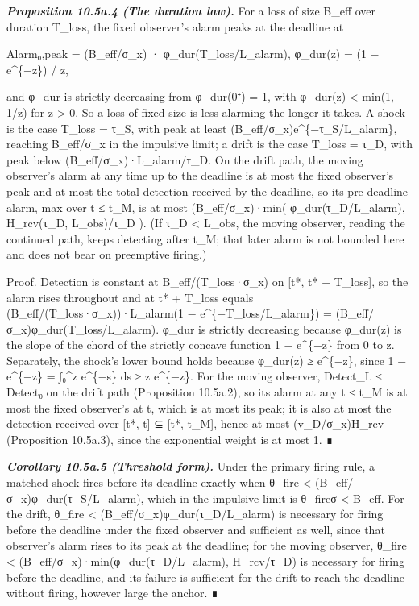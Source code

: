 \documentclass[
]{article}
\begin{document}
\emph{\textbf{Proposition 10.5a.4 (The duration law).}} For a loss of
size B\_eff over duration T\_loss, the fixed observer's alarm peaks at
the deadline at

Alarm₀,peak = (B\_eff/σ\_x) · φ\_dur(T\_loss/L\_alarm), φ\_dur(z) = (1 −
e\^{}\{−z\}) / z,

and φ\_dur is strictly decreasing from φ\_dur(0⁺) = 1, with φ\_dur(z)
\textless{} min(1, 1/z) for z \textgreater{} 0. So a loss of fixed size
is less alarming the longer it takes. A shock is the case T\_loss =
τ\_S, with peak at least (B\_eff/σ\_x)e\^{}\{−τ\_S/L\_alarm\}, reaching
B\_eff/σ\_x in the impulsive limit; a drift is the case T\_loss = τ\_D,
with peak below (B\_eff/σ\_x)·L\_alarm/τ\_D. On the drift path, the
moving observer's alarm at any time up to the deadline is at most the
fixed observer's peak and at most the total detection received by the
deadline, so its pre-deadline alarm, max over t ≤ t\_M, is at most
(B\_eff/σ\_x)·min( φ\_dur(τ\_D/L\_alarm), H\_rcv(τ\_D, L\_obs)/τ\_D ).
(If τ\_D \textless{} L\_obs, the moving observer, reading the continued
path, keeps detecting after t\_M; that later alarm is not bounded here
and does not bear on preemptive firing.)

Proof. Detection is constant at B\_eff/(T\_loss·σ\_x) on {[}t*, t* +
T\_loss{]}, so the alarm rises throughout and at t* + T\_loss equals
(B\_eff/(T\_loss·σ\_x))·L\_alarm(1 − e\^{}\{−T\_loss/L\_alarm\}) =
(B\_eff/σ\_x)φ\_dur(T\_loss/L\_alarm). φ\_dur is strictly decreasing
because φ\_dur(z) is the slope of the chord of the strictly concave
function 1 − e\^{}\{−z\} from 0 to z. Separately, the shock's lower
bound holds because φ\_dur(z) ≥ e\^{}\{−z\}, since 1 − e\^{}\{−z\} =
∫₀\^{}z e\^{}\{−s\} ds ≥ z e\^{}\{−z\}. For the moving observer,
Detect\_L ≤ Detect₀ on the drift path (Proposition 10.5a.2), so its
alarm at any t ≤ t\_M is at most the fixed observer's at t, which is at
most its peak; it is also at most the detection received over {[}t*,
t{]} ⊆ {[}t*, t\_M{]}, hence at most (v\_D/σ\_x)H\_rcv (Proposition
10.5a.3), since the exponential weight is at most 1. ∎

\emph{\textbf{Corollary 10.5a.5 (Threshold form).}} Under the primary
firing rule, a matched shock fires before its deadline exactly when
θ\_fire \textless{} (B\_eff/σ\_x)φ\_dur(τ\_S/L\_alarm), which in the
impulsive limit is θ\_fireσ \textless{} B\_eff. For the drift, θ\_fire
\textless{} (B\_eff/σ\_x)φ\_dur(τ\_D/L\_alarm) is necessary for firing
before the deadline under the fixed observer and sufficient as well,
since that observer's alarm rises to its peak at the deadline; for the
moving observer, θ\_fire \textless{}
(B\_eff/σ\_x)·min(φ\_dur(τ\_D/L\_alarm), H\_rcv/τ\_D) is necessary for
firing before the deadline, and its failure is sufficient for the drift
to reach the deadline without firing, however large the anchor. ∎
\end{document}
